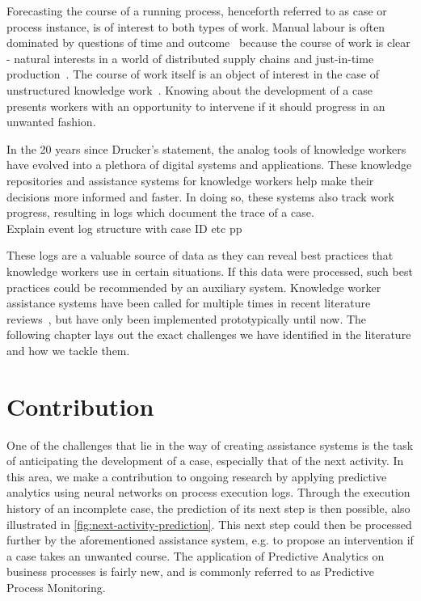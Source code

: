 Forecasting the course of a running process, henceforth referred to as case or process instance, is of interest to both types of work. Manual labour is often dominated by questions of time and outcome~\cite{rogge2013} because the course of work is clear - natural interests in a world of distributed supply chains and just-in-time production~\cite{web:economist:jit}. The course of work itself is an object of interest in the case of unstructured knowledge work~\cite{francescomarino2015}. Knowing about the development of a case presents workers with an opportunity to intervene if it should progress in an unwanted fashion.

In the 20 years since Drucker's statement, the analog tools of knowledge workers have evolved into a plethora of digital systems and applications. These knowledge repositories and assistance systems for knowledge workers help make their decisions more informed and faster. In doing so, these systems also track work progress, resulting in logs which document the trace of a case.\\

Explain event log structure with case ID etc pp

These logs are a valuable source of data as they can reveal best practices that knowledge workers use in certain situations. If this data were processed, such best practices could be recommended by an auxiliary system. Knowledge worker assistance systems have been called for multiple times in recent literature reviews~\cite{hauder2014, francescomarino2018}, but have only been implemented prototypically until now. The following chapter lays out the exact challenges we have identified in the literature and how we tackle them.

\section{Contribution}\label{sec:intro:contribution}
One of the challenges that lie in the way of creating assistance systems is the task of anticipating the development of a case, especially that of the next activity. In this area, we make a contribution to ongoing research by applying predictive analytics using neural networks on process execution logs. Through the execution history of an incomplete case, the prediction of its next step is then possible, also illustrated in \autoref{fig:next-activity-prediction}. This next step could then be processed further by the aforementioned assistance system, e.g. to propose an intervention if a case takes an unwanted course. The application of Predictive Analytics on business processes is fairly new, and is commonly referred to as Predictive Process Monitoring. \\

